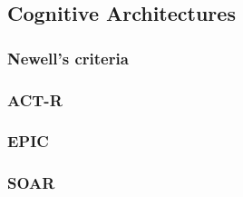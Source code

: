 \subsection{Cognitive Architectures}

\subsubsection{Newell's criteria}

\subsubsection{ACT-R}

\subsubsection{EPIC}

\subsubsection{SOAR} 
\label{ClassicalPerspective}
   